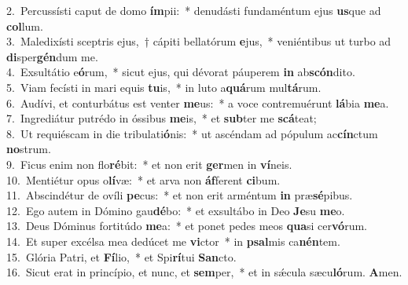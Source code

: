 {2.~}Percussísti caput de domo \textbf{ím}pii:~* denudásti fundaméntum ejus \textbf{us}que ad \textbf{col}lum.\\
{3.~}Maledixísti sceptris ejus,~† cápiti bellatórum \textbf{e}jus,~* veniéntibus ut turbo ad \textbf{di}sper\textbf{gén}dum me.\\
{4.~}Exsultátio e\textbf{ó}rum,~* sicut ejus, qui dévorat páuperem \textbf{in} ab\textbf{scón}dito.\\
{5.~}Viam fecísti in mari equis \textbf{tu}is,~* in luto a\textbf{quá}rum mul\textbf{tá}rum.\\
{6.~}Audívi, et conturbátus est venter \textbf{me}us:~* a voce contremuérunt \textbf{lá}bia \textbf{me}a.\\
{7.~}Ingrediátur putrédo in óssibus \textbf{me}is,~* et \textbf{sub}ter me \textbf{scá}teat;\\
{8.~}Ut requiéscam in die tribulati\textbf{ó}nis:~* ut ascéndam ad pópulum ac\textbf{cín}ctum \textbf{no}strum.\\
{9.~}Ficus enim non flo\textbf{ré}bit:~* et non erit \textbf{ger}men in \textbf{ví}neis.\\
{10.~}Mentiétur opus o\textbf{lí}væ:~* et arva non \textbf{áf}ferent \textbf{ci}bum.\\
{11.~}Abscindétur de ovíli \textbf{pe}cus:~* et non erit arméntum \textbf{in} præ\textbf{sé}pibus.\\
{12.~}Ego autem in Dómino gau\textbf{dé}bo:~* et exsultábo in Deo \textbf{Je}su \textbf{me}o.\\
{13.~}Deus Dóminus fortitúdo \textbf{me}a:~* et ponet pedes meos \textbf{qua}si cer\textbf{vó}rum.\\
{14.~}Et super excélsa mea dedúcet me \textbf{vi}ctor~* in \textbf{psal}mis ca\textbf{nén}tem.\\
{15.~}Glória Patri, et \textbf{Fí}lio,~* et Spi\textbf{rí}tui \textbf{San}cto.\\
{16.~}Sicut erat in princípio, et nunc, et \textbf{sem}per,~* et in sǽcula sæcu\textbf{ló}rum. \textbf{A}men.\\
